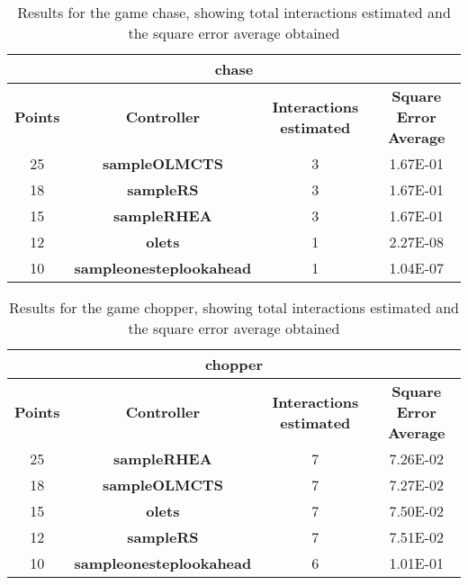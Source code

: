\begin{table*}[!t]
\begin{center}
\begin{adjustbox}{width=1\textwidth}
\begin{tabular}{|c|c|c|c|}
\hline
\multicolumn{4}{|c|}{\textbf{chase}}\\
\hline
\textbf{Points} & \textbf{Controller} & \textbf{Interactions estimated} & \textbf{Square Error Average}\\
\hline
25 & \textbf{sampleOLMCTS} & 3 & 1.67E-01
 \\
\hline
18 & \textbf{sampleRS} & 3 & 1.67E-01
 \\
\hline
15 & \textbf{sampleRHEA} & 3 & 1.67E-01
 \\
\hline
12 & \textbf{olets} & 1 & 2.27E-08
 \\
\hline
10 & \textbf{sampleonesteplookahead} & 1 & 1.04E-07
 \\
\hline
\end{tabular}
\end{adjustbox}
\caption{Results for the game chase, showing total interactions estimated and the square error average obtained}
\label{tab:weights}
\end{center}
\end{table*}
\begin{table*}[!t]
\begin{center}
\begin{adjustbox}{width=1\textwidth}
\begin{tabular}{|c|c|c|c|}
\hline
\multicolumn{4}{|c|}{\textbf{chopper}}\\
\hline
\textbf{Points} & \textbf{Controller} & \textbf{Interactions estimated} & \textbf{Square Error Average}\\
\hline
25 & \textbf{sampleRHEA} & 7 & 7.26E-02
 \\
\hline
18 & \textbf{sampleOLMCTS} & 7 & 7.27E-02
 \\
\hline
15 & \textbf{olets} & 7 & 7.50E-02
 \\
\hline
12 & \textbf{sampleRS} & 7 & 7.51E-02
 \\
\hline
10 & \textbf{sampleonesteplookahead} & 6 & 1.01E-01
 \\
\hline
\end{tabular}
\end{adjustbox}
\caption{Results for the game chopper, showing total interactions estimated and the square error average obtained}
\label{tab:weights}
\end{center}
\end{table*}
